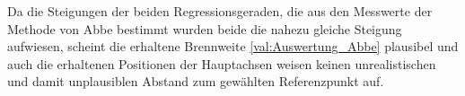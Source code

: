 Da die Steigungen der beiden Regressionsgeraden, die aus den Messwerte der Methode von Abbe bestimmt wurden
beide die nahezu gleiche Steigung aufwiesen, scheint die erhaltene Brennweite \cref{val:Auswertung_Abbe} 
plausibel und auch die erhaltenen Positionen der Hauptachsen weisen keinen unrealistischen 
und damit unplausiblen Abstand zum gewählten Referenzpunkt auf.



 
 
 